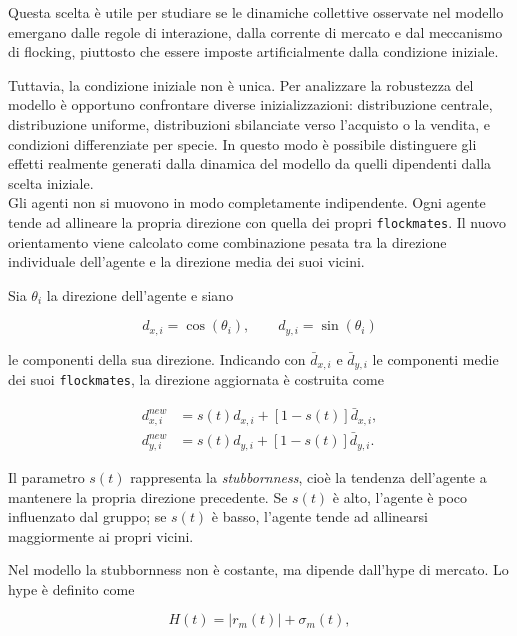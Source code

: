 Questa scelta è utile per studiare se le dinamiche collettive osservate nel
modello emergano dalle regole di interazione, dalla corrente di mercato e dal
meccanismo di flocking, piuttosto che essere imposte artificialmente dalla
condizione iniziale.

Tuttavia, la condizione iniziale non è unica. Per analizzare la robustezza del
modello è opportuno confrontare diverse inizializzazioni: distribuzione centrale,
distribuzione uniforme, distribuzioni sbilanciate verso l'acquisto o la vendita,
e condizioni differenziate per specie. In questo modo è possibile distinguere gli
effetti realmente generati dalla dinamica del modello da quelli dipendenti dalla
scelta iniziale.\\


Gli agenti non si muovono in modo completamente indipendente. Ogni agente tende
ad allineare la propria direzione con quella dei propri \texttt{flockmates}. Il
nuovo orientamento viene calcolato come combinazione pesata tra la direzione
individuale dell'agente e la direzione media dei suoi vicini.

Sia \(\theta_i\) la direzione dell'agente e siano

\begin{equation}
    d_{x,i} = \cos(\theta_i),
    \qquad
    d_{y,i} = \sin(\theta_i)
\end{equation}

le componenti della sua direzione. Indicando con
\(\bar{d}_{x,i}\) e \(\bar{d}_{y,i}\) le componenti medie dei suoi
\texttt{flockmates}, la direzione aggiornata è costruita come

\begin{align}
    d_{x,i}^{new}
    &=
    s(t)d_{x,i}
    +
    \left[1-s(t)\right]\bar{d}_{x,i}, \\
    d_{y,i}^{new}
    &=
    s(t)d_{y,i}
    +
    \left[1-s(t)\right]\bar{d}_{y,i}.
\end{align}

Il parametro \(s(t)\) rappresenta la \textit{stubbornness}, cioè la tendenza
dell'agente a mantenere la propria direzione precedente. Se \(s(t)\) è alto,
l'agente è poco influenzato dal gruppo; se \(s(t)\) è basso, l'agente tende ad
allinearsi maggiormente ai propri vicini.

Nel modello la stubbornness non è costante, ma dipende dall'hype di mercato. Lo
hype è definito come

\begin{equation}
    H(t)=|r_m(t)|+\sigma_m(t),
\end{equation}

